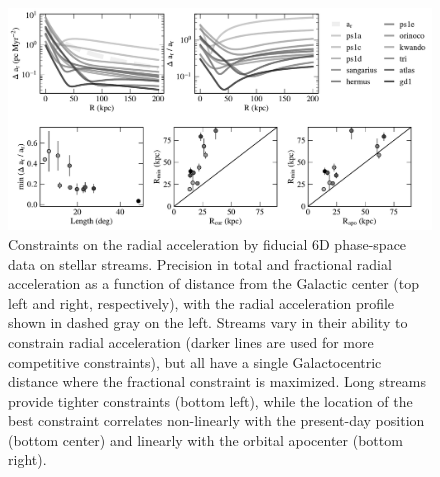 \documentclass[modern]{aastex61}
\begin{document}
\begin{figure}
\begin{center}
\includegraphics[width=\textwidth]{ar_crb.pdf}
\caption{Constraints on the radial acceleration by fiducial 6D phase-space data on stellar streams.
Precision in total and fractional radial acceleration as a function of distance from the Galactic center (top left and right, respectively), with the radial acceleration profile shown in dashed gray on the left.
Streams vary in their ability to constrain radial acceleration (darker lines are used for more competitive constraints), but all have a single Galactocentric distance where the fractional constraint is maximized.
Long streams provide tighter constraints (bottom left), while the location of the best constraint correlates non-linearly with the present-day position (bottom center) and linearly with the orbital apocenter (bottom right).
}
\label{fig:ar}
\end{center}
\end{figure}
\end{document}
